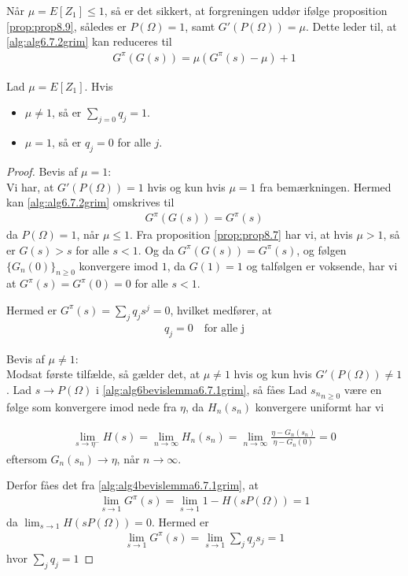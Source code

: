 \begin{rem}
Når $\mu=E[Z_1] \leq 1$, så er det sikkert, at forgreningen uddør ifølge proposition \ref{prop:prop8.9}, således er $P(\Omega)=1$, samt $G'(P(\Omega))=\mu$. Dette leder til, at \eqref{alg:alg6.7.2grim} kan reduceres til 
\begin{align*}
    G^\pi(G(s))=\mu (G^\pi(s)-\mu)+1
\end{align*}
\end{rem}
\begin{cor} \label{cor:cor6.7.7grim}
Lad $\mu=E[Z_1]$. Hvis 
\begin{itemize}
    \item $\mu \neq 1$, så er $\sum_{j=0}q_j=1$. 
    \item $\mu=1$, så er $q_j=0$ for alle $j$. 
\end{itemize}
\end{cor}
\begin{proof}
Bevis af $\mu=1$:\\
Vi har, at $G'(P(\Omega))=1$ hvis og kun hvis $\mu=1$ fra bemærkningen. Hermed kan \eqref{alg:alg6.7.2grim} omskrives til \begin{align*}
    G^\pi(G(s))=G^\pi(s)
\end{align*}
da $P(\Omega)=1$, når $\mu\leq1$. Fra proposition \ref{prop:prop8.7} har vi, at hvis $\mu > 1$, så er $G(s)>s$ for alle $s<1$. Og da $G^\pi(G(s)) =G^\pi(s)$, og følgen $\{G_n(0)\}_{n \geq 0}$ konvergere imod $1$, da $G(1) = 1$ og talfølgen er voksende, har vi at $G^\pi(s)=G^\pi(0)=0$ for alle $s<1$. 

Hermed er $G^\pi(s)=\sum_j q_j s^j =0$, hvilket medfører, at
\begin{align*}
    q_j=0 \quad \text{for alle j}
\end{align*}

Bevis af $\mu\neq1$:\\ 
Modsat første tilfælde, så gælder det, at $\mu\neq1$ hvis og kun hvis $G'(P(\Omega))\neq 1$. Lad $s\to P(\Omega)$ i \eqref{alg:alg6bevislemma6.7.1grim}, så fåes
Lad ${s_n}_{n \geq 0}$ være en følge som konvergere imod nede fra $\eta$, da $H_n(s_n)$ konvergere uniformt har vi

\begin{align*}
    \lim_{s\to \eta^-}H(s)= \lim_{n \to \infty} H_n(s_n) = \lim_{n \to \infty} \frac{\eta - G_n(s_n)}{\eta - G_n(0)} = 0
\end{align*}
eftersom $G_n(s_n) \to \eta$, når $n \to \infty$.

Derfor fåes det fra \eqref{alg:alg4bevislemma6.7.1grim}, at
\begin{align*}
    \lim_{s\to 1} G^\pi(s)=\lim_{s\to 1} 1-H(sP(\Omega))=1 
\end{align*}
da $\lim_{s\to 1} H(sP(\Omega))=0$. Hermed
er
\begin{align*}
    \lim_{s\to 1} G^\pi(s)=\lim_{s\to 1} \sum_j q_js_j =1
\end{align*}
hvor $\sum_j q_j=1$
\end{proof}

